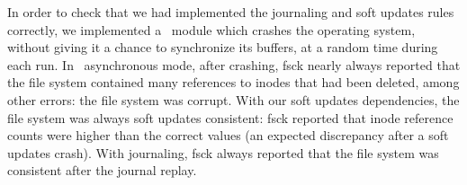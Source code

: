 In order to check that we had implemented the journaling and soft updates
rules correctly,
we implemented a \Kudos\ module which crashes the operating system, without
giving it a chance to synchronize its buffers, at a random time during each
run.
%
In \Kudos\ asynchronous mode, after crashing, fsck nearly always reported
that the file system contained many references to inodes that had been
deleted, among other errors: the file system was corrupt.
%
With our soft updates dependencies, the file system was always soft updates
consistent: fsck reported that inode reference counts were higher than the
correct values (an expected discrepancy after a soft updates crash).
%
With journaling, fsck always reported that the file system was
consistent after the journal replay.

\subsection {\Patchgroups}
\label{sec:evaluation:uwimap}


